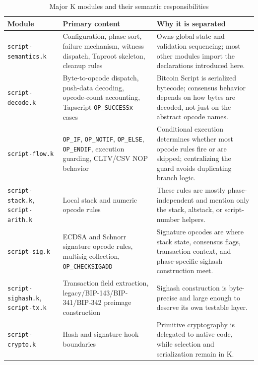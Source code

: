 \documentclass[conference]{IEEEtran}
\begin{document}
\begin{table}[t]
  \caption{Major K modules and their semantic responsibilities}
  \label{tab:modules}
  \centering
  \footnotesize
  \begin{tabular}{p{}p{}p{}}
    \toprule
    Module & Primary content & Why it is separated \\
    \midrule
    \texttt{script-semantics.k} &
    Configuration, phase sort, failure mechanism, witness dispatch, Taproot
    skeleton, cleanup rules &
    Owns global state and validation sequencing; most other modules import the
    declarations introduced here. \\
    \texttt{script-decode.k} &
    Byte-to-opcode dispatch, push-data decoding, opcode-count accounting,
    Tapscript \texttt{OP\_SUCCESSx} cases &
    Bitcoin Script is serialized bytecode; consensus behavior depends on how
    bytes are decoded, not just on the abstract opcode names. \\
    \texttt{script-flow.k} &
    \texttt{OP\_IF}, \texttt{OP\_NOTIF}, \texttt{OP\_ELSE},
    \texttt{OP\_ENDIF}, execution guarding, CLTV/CSV NOP behavior &
    Conditional execution determines whether most opcode rules fire or are
    skipped; centralizing the guard avoids duplicating branch logic. \\
    \texttt{script-stack.k}, \texttt{script-arith.k} &
    Local stack and numeric opcode rules &
    These rules are mostly phase-independent and mention only the stack,
    altstack, or script-number helpers. \\
    \texttt{script-sig.k} &
    ECDSA and Schnorr signature opcode rules, multisig collection,
    \texttt{OP\_CHECKSIGADD} &
    Signature opcodes are where stack state, consensus flags, transaction
    context, and phase-specific sighash construction meet. \\
    \texttt{script-sighash.k}, \texttt{script-tx.k} &
    Transaction field extraction, legacy/BIP-143/BIP-341/BIP-342 preimage
    construction &
    Sighash construction is byte-precise and large enough to deserve its own
    testable layer. \\
    \texttt{script-crypto.k} &
    Hash and signature hook boundaries &
    Primitive cryptography is delegated to native code, while selection and
    serialization remain in K. \\
    \bottomrule
  \end{tabular}
\end{table}
\end{document}
